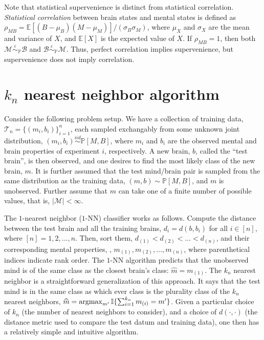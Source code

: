 \documentclass{article}
\newcommand{\mB}{\mathcal{B}}
\newcommand{\mM}{\mathcal{M}}
\newcommand{\PP}{\mathbb{P}}           %
\newcommand{\EE}{\mathbb{E}}           %
\newcommand{\II}{\mathbb{I}}           %
\newcommand{\sig}{\sigma}
\providecommand{\mc}[1]{\mathcal{#1}}
\providecommand{\mh}[1]{\widehat{#1}}
\newcommand{\argmax}{\operatornamewithlimits{argmax}}
\newcommand{\MeB}{\mM \overset{\varepsilon}{{\sim}}_{\PP} \mB}
\begin{document}
Note that statistical supervenience is distinct from statistical correlation.  \emph{Statistical correlation} between brain states and mental states is defined as $\rho_{MB}=\EE[(B-\mu_B)(M-\mu_M)]/(\sig_B \sig_M)$, where $\mu_X$ and $\sig_X$ are the mean and variance of $X$, and $\EE[X]$ is the expected value of $X$.  If $\rho_{MB}=1$, then both $\MeB$ and $\mB \overset{\varepsilon}{{\sim}}_{\PP} \mM$. Thus, perfect correlation implies supervenience, but supervenience does not imply correlation.  



\section{$k_n$ nearest neighbor algorithm} %
\label{sec:knn}

Consider the following problem setup.  We have a collection of training data, $\mc{T}_n =\{(m_i,b_i)\}_{i=1}^n$, each sampled exchangably from some unknown joint distribution, $(m_i,b_i)\overset{iid}{\sim} \PP[M,B]$, where $m_i$ and $b_i$ are the observed mental and brain properties of experiment $i$, respectively.  A new brain, $b$, called the ``test brain'', is then observed, and one desires to find the most likely class of the new brain, $m$.  It is further assumed that the test mind/brain pair is sampled from the same distribution as the training data, $(m,b)\sim \PP[M,B]$, and $m$ is unobserved. Further assume that $m$ can take one of a finite number of possible values, that is, $|\mc{M}|<\infty$.

The $1$-nearest neighbor ($1$-NN) classifier works as follows.  Compute the distance between the test brain and all the training brains, $d_i=d(b,b_i)$ for all $i \in [n]$, where $[n]=1,2,\ldots, n$.  Then, sort them, $d_{(1)} < d_{(2)} < \ldots < d_{(n)}$, and their corresponding mental properties, , $m_{(1)}, m_{(2)}, \ldots, m_{(n)}$, where parenthetical indices indicate rank order.  %
The $1$-NN algorithm predicts that the unobserved mind is of the same class as the closest brain's class: $\mh{m}=m_{(1)}$.  The $k_n$ nearest neighbor is a straightforward generalization of this approach.  It says that the test mind is in the same class as which ever class is the plurality class of the $k_n$ nearest neighbors, $\mh{m}=\argmax_{m'}\II\{\sum_{i=1}^{k_n} m_{(i)}=m'\}$.  Given a particular choice of $k_n$ (the number of nearest neighbors to consider), and a choice of $d(\cdot,\cdot)$ (the distance metric used to compare the test datum and training data), one then has a relatively simple and intuitive algorithm.  
\end{document}
